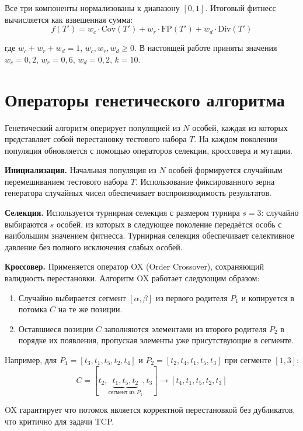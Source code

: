 Все три компоненты нормализованы к диапазону $[0, 1]$. Итоговый фитнесс вычисляется как взвешенная сумма:
$$f(T') = w_c \cdot \text{Cov}(T') + w_r \cdot \text{FP}(T') + w_d \cdot \text{Div}(T')$$

где $w_c + w_r + w_d = 1$, $w_c, w_r, w_d \geq 0$. В настоящей 
работе приняты значения $w_c = 0{,}2$, $w_r = 0{,}6$, $w_d = 0{,}2$, 
$k = 10$.

\section{Операторы генетического алгоритма} \label{ch3:sec2}

Генетический алгоритм оперирует популяцией из $N$ особей, каждая из которых представляет собой перестановку 
тестового набора $T$. На каждом поколении популяция обновляется с помощью операторов селекции, кроссовера и мутации.

\textbf{Инициализация.} Начальная популяция из $N$ особей формируется случайным перемешиванием тестового набора $T$.
Использование фиксированного зерна генератора случайных чисел обеспечивает воспроизводимость результатов.

\textbf{Селекция.} Используется турнирная селекция с размером турнира $s = 3$: случайно выбираются $s$ особей, 
из которых в следующее поколение передаётся особь с наибольшим значением фитнесса. Турнирная селекция обеспечивает 
селективное давление без полного исключения слабых особей.

\textbf{Кроссовер.} Применяется оператор OX (Order Crossover), сохраняющий валидность перестановки. 
Алгоритм OX работает следующим 
образом:
\begin{enumerate}
    \item Случайно выбирается сегмент $[\alpha, \beta]$ из первого 
    родителя $P_1$ и копируется в потомка $C$ на те же позиции.
    \item Оставшиеся позиции $C$ заполняются элементами из второго 
    родителя $P_2$ в порядке их появления, пропуская элементы уже 
    присутствующие в сегменте.
\end{enumerate}

Например, для $P_1 = [t_3, t_1, t_5, t_2, t_4]$ и 
$P_2 = [t_2, t_4, t_1, t_5, t_3]$ при сегменте $[1, 3]$:
$$C = [t_2, \underbrace{t_1, t_5, t_2}_{\text{сегмент из } P_1}, t_3]
\rightarrow [t_4, t_1, t_5, t_2, t_3]$$

OX гарантирует что потомок является корректной перестановкой без дубликатов, что критично для задачи TCP.


